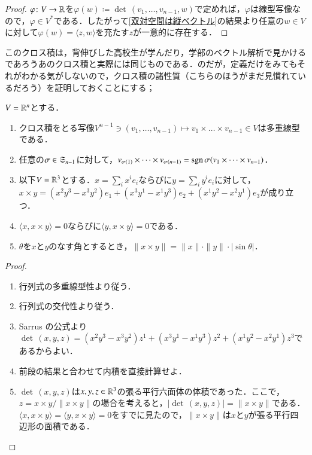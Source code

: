 \begin{proof}
$\varphi \colon V \to \mathbb{R}$を$\varphi(w) \coloneqq \det\, (v_1, \dots, v_{n-1}, w)$で定めれば，$\varphi$は線型写像なので，$\varphi \in V^*$である．したがって\cref{双対空間は縦ベクトル}の結果より任意の$w \in V$に対して$\varphi(w) = \langle z,w \rangle$を充たす$z$が一意的に存在する．
\end{proof}

このクロス積は，背伸びした高校生が学んだり，学部のベクトル解析で見かけるであろうあのクロス積と実際には同じものである．のだが，定義だけをみてもそれがわかる気がしないので，クロス積の諸性質（こちらのほうがまだ見慣れているだろう）を証明しておくことにする；

\begin{prop}[クロス積の基本性質]$V = \mathbb{R}^n$とする．
\begin{enumerate}
\item クロス積をとる写像$V^{n-1} \ni (v_1, \dots, v_{n-1}) \mapsto v_1 \times \dots \times v_{n-1} \in V$は多重線型である．
\item 任意の$\sigma \in \mathfrak{S}_{n-1}$に対して，$v_{\sigma(1)} \times \dots \times v_{\sigma(n-1)} = \operatorname{sgn} \sigma (v_1 \times \dots \times v_{n-1})$．
\item 以下$V=\mathbb{R}^3$とする．$x = \sum_i x^i e_i$ならびに$y = \sum_i y^i e_i$に対して，$x \times y = (x^2y^3 - x^3y^2)e_1 + (x^3y^1 - x^1y^3)e_2 + (x^1y^2 - x^2y^1)e_3$が成り立つ．
\item $\langle x, x \times y \rangle = 0$ならびに$\langle y, x \times y \rangle = 0$である．
\item $\theta$を$x$と$y$のなす角とするとき，$\|x \times y\| = \|x\| \cdot \|y\| \cdot \lvert \sin \theta \rvert$．
\end{enumerate}
\end{prop}

\begin{proof}
\leavevmode
\begin{enumerate}
\item 行列式の多重線型性より従う．
\item 行列式の交代性より従う．
\item Sarrus の公式より$\det \, (x,y,z) = (x^2y^3 - x^3y^2)z^1 + (x^3y^1 - x^1y^3)z^2 + (x^1y^2 - x^2y^1)z^3$であるからよい．
\item 前段の結果と合わせて内積を直接計算せよ．
\item $\det \, (x,y,z)$は$x,y,z \in \mathbb{R}^3$の張る平行六面体の体積であった．ここで，$z = x \times y / \| x \times y \|$の場合を考えると，$\lvert \det \, (x,y,z) \rvert = \|x \times y\|$である．$\langle x, x \times y \rangle = \langle y, x \times y \rangle = 0$をすでに見たので，$\|x \times y\|$は$x$と$y$が張る平行四辺形の面積である．
\end{enumerate}
\end{proof}


